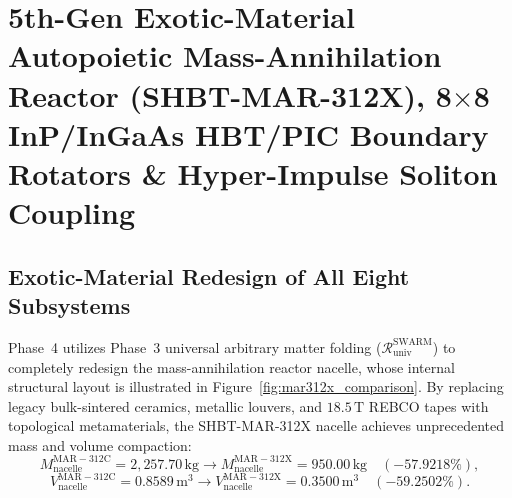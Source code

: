 \documentclass[11pt,onecolumn]{article}
\begin{document}
\section{5th-Gen Exotic-Material Autopoietic Mass-Annihilation Reactor (SHBT-MAR-312X), \texorpdfstring{8$\times$8}{8x8} InP/InGaAs HBT/PIC Boundary Rotators \& Hyper-Impulse Soliton Coupling}
\label{sec:mar312x_reactor}

\subsection{Exotic-Material Redesign of All Eight Subsystems}
\label{sec:mar312x_subsystems}
Phase~4 utilizes Phase~3 universal arbitrary matter folding ($\mathcal{R}_{\mathrm{univ}}^{\mathrm{SWARM}}$) to completely redesign the mass-annihilation reactor nacelle, whose internal structural layout is illustrated in Figure~\ref{fig:mar312x_comparison}. By replacing legacy bulk-sintered ceramics, metallic louvers, and $18.5\,\mathrm{T}$ REBCO tapes with topological metamaterials, the SHBT-MAR-312X nacelle achieves unprecedented mass and volume compaction:
\begin{equation}
    M_{\mathrm{nacelle}}^{\mathrm{MAR-312C}} = 2{,}257.70\,\mathrm{kg} \longrightarrow M_{\mathrm{nacelle}}^{\mathrm{MAR-312X}} = 950.00\,\mathrm{kg} \quad (-57.9218\%),
    \label{eq:nacelle_mass_compaction}
\end{equation}
\begin{equation}
    V_{\mathrm{nacelle}}^{\mathrm{MAR-312C}} = 0.8589\,\mathrm{m}^3 \longrightarrow V_{\mathrm{nacelle}}^{\mathrm{MAR-312X}} = 0.3500\,\mathrm{m}^3 \quad (-59.2502\%).
    \label{eq:nacelle_volume_compaction}
\end{equation}
\end{document}
